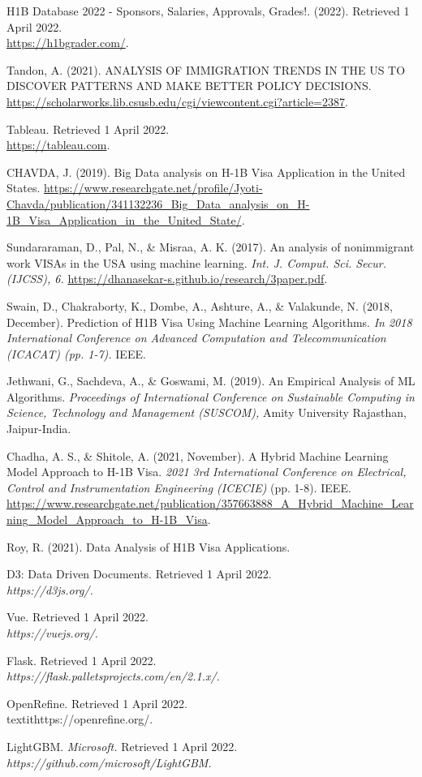 \documentclass[sigconf]{acmart}
\begin{document}
\begin{thebibliography}{12}
\bibitem{}
H1B Database 2022 - Sponsors, Salaries, Approvals, Grades!. 
(2022). 
Retrieved 1 April 2022. 
\\\url{https://h1bgrader.com/}.

\bibitem{}
Tandon, A. 
(2021). 
ANALYSIS OF IMMIGRATION TRENDS IN THE US TO DISCOVER PATTERNS AND MAKE BETTER POLICY DECISIONS.
\\\url{https://scholarworks.lib.csusb.edu/cgi/viewcontent.cgi?article=2387}.

\bibitem{}
Tableau.
Retrieved 1 April 2022.
\\\url{https://tableau.com}.

\bibitem{}
CHAVDA, J. 
(2019). 
Big Data analysis on H-1B Visa Application in the United States.
\url{https://www.researchgate.net/profile/Jyoti-Chavda/publication/341132236_Big_Data_analysis_on_H-1B_Visa_Application_in_the_United_State/}.

\bibitem{}
Sundararaman, D., Pal, N., \& Misraa, A. K. 
(2017). 
An analysis of nonimmigrant work VISAs in the USA using machine learning. 
\textit{Int. J. Comput. Sci. Secur.(IJCSS), 6.}
\url{https://dhanasekar-s.github.io/research/3paper.pdf}.

\bibitem{}
Swain, D., Chakraborty, K., Dombe, A., Ashture, A., \& Valakunde, N. 
(2018, December). 
Prediction of H1B Visa Using Machine Learning Algorithms. 
\textit{In 2018 International Conference on Advanced Computation and Telecommunication (ICACAT) (pp. 1-7).} 
IEEE. 

\bibitem{}
Jethwani, G., Sachdeva, A., \& Goswami, M. 
(2019). 
An Empirical Analysis of ML Algorithms. 
\textit{Proceedings of International Conference on Sustainable Computing in Science, Technology and Management (SUSCOM),} 
Amity University Rajasthan, Jaipur-India.

\bibitem{}
Chadha, A. S., \& Shitole, A. 
(2021, November). 
A Hybrid Machine Learning Model Approach to H-1B Visa. 
\textit{2021 3rd International Conference on Electrical, Control and Instrumentation Engineering (ICECIE)} (pp. 1-8). 
IEEE.
\url{https://www.researchgate.net/publication/357663888_A_Hybrid_Machine_Learning_Model_Approach_to_H-1B_Visa}.

\bibitem{}
Roy, R. (2021). 
Data Analysis of H1B Visa Applications.

\bibitem{}
D3: Data Driven Documents. 
Retrieved 1 April 2022. 
\\\textit{https://d3js.org/.}

\bibitem{}
Vue. 
Retrieved 1 April 2022. 
\\\textit{https://vuejs.org/.}

\bibitem{}
Flask. 
Retrieved 1 April 2022. 
\\\textit{https://flask.palletsprojects.com/en/2.1.x/.}

\bibitem{}
OpenRefine. 
Retrieved 1 April 2022. 
\\textit{https://openrefine.org/.}

\bibitem{}
LightGBM. 
\textit{Microsoft.} 
Retrieved 1 April 2022. 
\\\textit{https://github.com/microsoft/LightGBM.}




\end{thebibliography}
\end{document}
